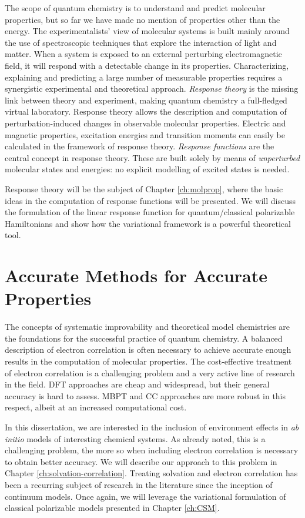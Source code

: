 The scope of quantum chemistry is to understand and predict molecular
properties, but so far we have made no mention of properties other than
the energy.
The experimentalists' view of molecular systems is built mainly around
the use of spectroscopic techniques that explore the interaction of
light and matter. When a system is exposed to an external perturbing
electromagnetic field, it will respond with a detectable change in its
properties.\autocite{Pedersen2012-il, Jaszunski2012-wy}
Characterizing, explaining and predicting a large number of measurable
properties requires a synergistic experimental and theoretical approach.
\emph{Response theory} is the missing link between theory and
experiment, making quantum chemistry a full-fledged virtual laboratory.
Response theory allows the description and computation of
perturbation-induced changes in observable molecular properties.
Electric and magnetic properties, excitation energies and transition
moments can easily be calculated in the framework of response theory.
\emph{Response functions} are the central concept in response theory.
These are built solely by means of \emph{unperturbed} molecular states and
energies: no explicit modelling of excited states is needed.

Response theory will be the subject of Chapter \ref{ch:molprop},
where the basic ideas in the computation of response functions will be
presented. We will discuss the formulation of the linear response
function for quantum/classical polarizable Hamiltonians and show how the
variational framework is a powerful theoretical tool.

\section*{Accurate Methods for Accurate Properties}

The concepts of systematic improvability and theoretical model
chemistries are the foundations for the successful practice of quantum
chemistry.
A balanced description of electron correlation is often necessary
to achieve accurate enough results in the computation of molecular
properties.\autocite{Lee1995-pw, Helgaker2004-oz, Tajti2004-ye}
The cost-effective treatment of electron correlation is a challenging
problem and a very active line of research in the field.
\Acrlong*{DFT} approaches are cheap and widespread, but their general
accuracy is hard to assess. \Acrlong*{MBPT} and \acrlong*{CC} approaches
are more robust in this respect, albeit at an increased computational
cost.

In this dissertation, we are interested in the inclusion of
environment effects in \emph{ab initio} models of interesting chemical
systems. As already noted, this is a challenging problem, the more so
when including electron correlation is necessary to obtain better
accuracy.
We will describe our approach to this problem in Chapter
\ref{ch:solvation-correlation}. Treating solvation and electron
correlation has been a recurring subject of research in the literature
since the inception of continuum models. Once again, we will leverage
the variational formulation of classical polarizable models presented
in Chapter \ref{ch:CSM}.
